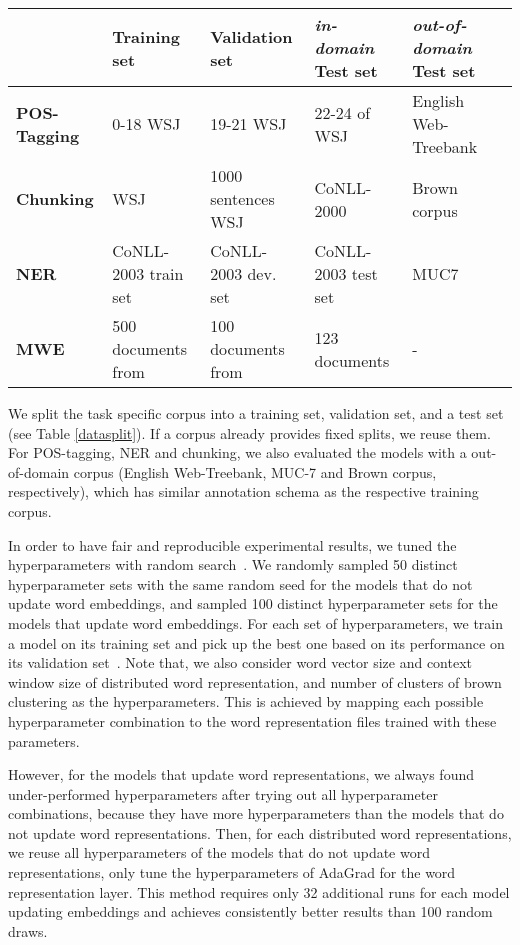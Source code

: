 \begin{table*}
\caption{Datasets splits and feature space for each sequence tagging task.}
\begin{small}
\begin{tabular}{lllp{}ll}
\hline
			& \textbf{Training set} & \textbf{Validation set} & \textbf{\textit{in-domain} Test set} & \textbf{\textit{out-of-domain} Test set} \\ \hline
\textbf{POS-Tagging} & 0-18 WSJ & 19-21 WSJ & 22-24 of WSJ & English Web-Treebank  \\
\textbf{Chunking} & WSJ & 1000 sentences WSJ & CoNLL-2000 & Brown corpus \\
\textbf{NER} & CoNLL-2003 train set & CoNLL-2003 dev. set & CoNLL-2003 test set & MUC7  \\
\textbf{MWE} & 500 documents from & 100 documents from & 123 documents & - \\
\hline
\end{tabular}
\label{datasplit}
\end{small}
\end{table*}

We split the task specific corpus into a training set, validation set, and a test set (see Table \ref{datasplit}). If a corpus already provides fixed splits, we reuse them. For POS-tagging,  NER and chunking, we also evaluated the models with a out-of-domain corpus (English Web-Treebank, MUC-7 and Brown corpus, respectively), which has similar annotation schema as the respective training corpus.

In order to have fair and reproducible experimental results, we tuned the hyperparameters with random search~\cite{bergstra2012random}. 
We randomly sampled 50 distinct hyperparameter sets with the same random seed for the models that do not update word embeddings, and sampled 100 distinct hyperparameter sets for the models that update word embeddings. 
For each set of hyperparameters, we train a model on its training set and pick up the best one based on its performance on its validation set~\cite{turian2010word}. 
Note that, we also consider word vector size and context window size of distributed word representation, and number of clusters of brown clustering as the hyperparameters.
This is achieved by mapping each possible hyperparameter combination to the word representation files trained with these parameters. 

However, for the models that update word representations, we always found under-performed hyperparameters after trying out all hyperparameter combinations, because they have more hyperparameters than the models that do not update word representations. Then, for each distributed word representations, we reuse all hyperparameters of the models that do not update word representations, only tune the hyperparameters of AdaGrad for the word representation layer. This method requires only 32 additional runs for each model updating embeddings and achieves consistently better results than 100 random draws.

